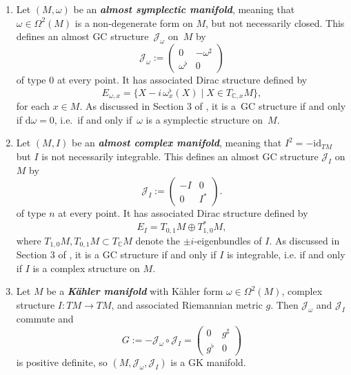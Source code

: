 \documentclass[11pt]{article}
\numberwithin{equation}{section}
\newcommand{\deff}[1]{\textbf{\emph{#1}}}
\newcommand{\func}[3]{#1 \colon #2 \to #3}
\newcommand{\tang}{T}
\begin{document}
\begin{Example} \label{example4} \qquad
\begin{enumerate}\itemsep=0pt
\item Let $(M,\omega)$ be an \deff{almost symplectic manifold}, meaning that $\omega \in \Omega^2(M)$ is a non-degenerate form on $M$, but not necessarily closed.  This def\/ines an almost GC structure~$\mathcal{J}_{\omega}$ on~$M$ by
\[
  \mathcal{J}_{\omega} :=
  \begin{pmatrix}
    0 & - \omega^{\sharp} \\
    \omega^{\flat} & 0
  \end{pmatrix}
\] of type $0$ at every point.
It has associated Dirac structure def\/ined by
\[
  E_{\omega, x}
  =
  \{ X - i \, \omega^{\flat}_x(X)
  \mid X \in \tang_{\mathbb{C}, x} M \},
\]
for each $x \in M$.  As discussed in Section 3 of \cite{gualtieri}, it is a~GC structure if and only if $\mathrm{d} \omega = 0$, i.e.\ if and only if~$\omega$ is a symplectic structure on~$M$.

\item Let $(M,I)$ be an \deff{almost complex manifold}, meaning that $I^2 = -\mathrm{id}_{\tang M}$ but $I$ is not necessarily integrable.  This def\/ines an almost GC structure $\mathcal{J}_{I}$ on $M$ by
\[
  \mathcal{J}_{I}
  :=
  \begin{pmatrix}
  -I & 0 \\
  0 & I^*
  \end{pmatrix}.
\]
of type $n$ at every point.  It has associated Dirac structure def\/ined by
\[
  E_{I}
  = \tang_{0,1} M \oplus \tang_{1,0}^* M,
\]
where $\tang_{1,0} M, \tang_{0,1} M \subset \tang_{\mathbb{C}} M$ denote the $\pm i$-eigenbundles of $I$.
 As discussed in Section 3 of \cite{gualtieri}, it is a GC structure if and only if $I$ is integrable, i.e. if and only if $I$ is a complex structure on $M$.

\item Let $M$ be a \deff{K\"ahler manifold} with K\"ahler form $\omega \in \Omega^2(M)$, complex structure $\func{I}{\tang M}{\tang M}$, and associated Riemannian metric $g$.  Then $\mathcal{J}_\omega$ and $\mathcal{J}_I$ commute and
\[
  G:=-\mathcal{J}_{\omega} \circ \mathcal{J}_I
  = \begin{pmatrix} 0 & g^{\sharp} \\ g^{\flat} & 0 \end{pmatrix}
\]
is positive def\/inite, so $(M, \mathcal{J}_{\omega}, \mathcal{J}_I)$ is a GK manifold.
\end{enumerate}
\end{Example}
\end{document}
